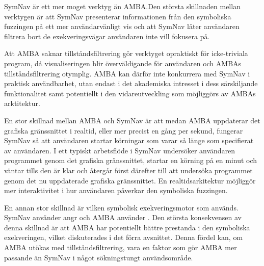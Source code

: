 SymNav är ett mer moget verktyg än AMBA.\@ Den största skillnaden mellan verktygen
är att SymNav presenterar informationen från den symboliska fuzzingen på ett mer
användarvänligt vis och att SymNav låter användaren filtrera bort de
exekveringsvägar användaren inte vill fokusera på.

Att AMBA saknar tillståndsfiltrering gör verktyget opraktiskt för icke-triviala
program, då visualiseringen blir överväldigande för användaren och AMBAs
tillståndsfiltrering otymplig. AMBA kan därför inte konkurrera med SymNav i
praktisk användbarhet, utan endast i det akademiska intresset i dess
särskiljande funktionalitet samt potentiellt i den vidareutveckling som
möjliggörs av AMBAs arktitektur.

En stor skillnad mellan AMBA och SymNav är att medan AMBA uppdaterar det
grafiska gränssnittet i realtid, eller mer precist en gång per sekund, fungerar
SymNav så att användaren startar körningar som varar så länge som specifierat av
användaren. I ett typiskt arbetsflöde i SymNav undersöker användaren programmet
genom det grafiska gränssnittet, startar en körning på en minut och väntar tills
den är klar och återgår först därefter till att undersöka programmet genom det
nu uppdaterade grafiska gränssnittet. En realtidsarkitektur möjliggör mer
interaktivitet i hur användaren påverkar den symboliska fuzzingen.

En annan stor skillnad är vilken symbolisk exekveringsmotor som används. SymNav
använder angr och AMBA använder \stoe{}. Den största konsekvensen av denna
skillnad är att AMBA har potentiellt bättre prestanda i den symboliska
exekveringen, vilket diskuterades i det förra avsnittet. Denna fördel kan, om
AMBA utökas med tillståndsfiltrering, vara en faktor som gör AMBA mer passande
än SymNav i något sökningstungt användsområde.

